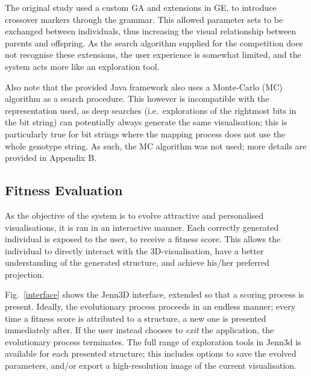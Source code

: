 \documentclass{article}
\begin{document}
The original study \cite{nicolau2011a} used a custom GA and extensions in GE,
to introduce crossover markers through the grammar. This allowed parameter sets
to be exchanged between individuals, thus increasing the visual relationship
between parents and offspring. As the search algorithm supplied for the
competition does not recognise these extensions, the user experience is
somewhat limited, and the system acts more like an exploration tool.

Also note that the provided Java framework \cite{browne2013a} also uses a
Monte-Carlo (MC) algorithm \cite{sutton98a} as a search procedure. This however is
incompatible with the representation used, as deep searches (i.e.~explorations
of the rightmost bits in the bit string) can potentially always generate the
same visualisation; this is particularly true for bit strings where the mapping
process does not use the whole genotype string. As such, the MC algorithm was
not used; more details are provided in Appendix B.

\subsection{Fitness Evaluation}

As the objective of the system is to evolve attractive and personalised
visualisations, it is ran in an interactive manner. Each correctly generated
individual is exposed to the user, to receive a fitness score. This allows the
individual to directly interact with the 3D-visualisation, have a better
understanding of the generated structure, and achieve his/her preferred
projection.

Fig.~\ref{interface} shows the Jenn3D interface, extended so that a scoring
process is present. Ideally, the evolutionary process proceeds in an endless
manner; every time a fitness score is attributed to a structure, a new one is
presented immediately after. If the user instead chooses to \textit{exit} the
application, the evolutionary process terminates. The full range of exploration
tools in Jenn3d is available for each presented structure; this includes
options to save the evolved parameters, and/or export a high-resolution image
of the current visualisation.
\end{document}
